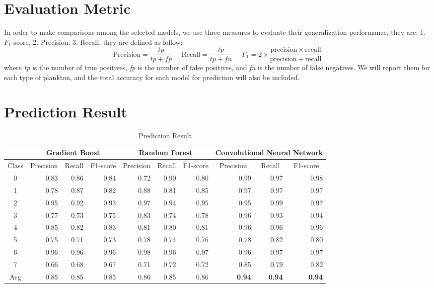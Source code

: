 \documentclass[11pt,oneside,a4paper]{article}
\numberwithin{equation}{section}
\begin{document}
\section{Evaluation Metric}
In order to make comparisons among the selected models, we use three measures to evaluate their generalization performance, they are: 1. $F_1$-score, 2. Precision, 3. Recall. they are defined as follow:
$$\mathrm{Precision} = \frac{tp}{tp + fp}~~~~~~
\mathrm{Recall} = \frac{{tp}}{{tp + fn}}~~~~~~
F_{1} = 2 \times \frac{\mathrm{precision} \times \mathrm{recall}}{\mathrm{precision} + \mathrm{recall}}$$
where \textit{tp} is the number of true positives, \textit{fp} is the number of false positives, and \textit{fn} is the number of false negatives. We will report them for each type of plankton, and the total accuracy for each model for prediction will also be included.

\section{Prediction Result}
\begin{table}[ht]
\centering
\small
\caption{Prediction Result}
\begin{tabular}{crrrrrrrrr}
\toprule
& \multicolumn{3}{c}{Gradient Boost} & \multicolumn{3}{c}{Random Forest} & \multicolumn{3}{c}{Convolutional Neural Network}\\
\midrule
\multicolumn{1}{c}{Class} & \multicolumn{1}{c}{Precision} & \multicolumn{1}{c}{Recall} & \multicolumn{1}{c}{F1-score} & \multicolumn{1}{c}{Precision} & \multicolumn{1}{c}{Recall} & \multicolumn{1}{c}{F1-score}& \multicolumn{1}{c}{Precision} & \multicolumn{1}{c}{Recall} & \multicolumn{1}{c}{F1-score} \\
0           & 0.83      & 0.86   & 0.84     & 0.72      & 0.90   & 0.80     & 0.99      & 0.97   & 0.98     \\
1           & 0.78      & 0.87   & 0.82     & 0.88      & 0.81   & 0.85     & 0.97      & 0.97   & 0.97     \\
2           & 0.95      & 0.92   & 0.93     & 0.97      & 0.94   & 0.95     & 0.95      & 0.99   & 0.97     \\
3           & 0.77      & 0.73   & 0.75     & 0.83      & 0.74   & 0.78     & 0.96      & 0.93   & 0.94     \\
4           & 0.85      & 0.82   & 0.83     & 0.81      & 0.80   & 0.81     & 0.96      & 0.96   & 0.96     \\
5           & 0.75      & 0.71   & 0.73     & 0.78      & 0.74   & 0.76     & 0.78      & 0.82   & 0.80     \\
6           & 0.96      & 0.96   & 0.96     & 0.98      & 0.96   & 0.97     & 0.96      & 0.97   & 0.97     \\
7           & 0.66      & 0.68   & 0.67     & 0.71      & 0.72   & 0.72     & 0.85      & 0.79   & 0.82     \\
\midrule
Avg         & 0.85      & 0.85   & 0.85     & 0.86      & 0.85   & 0.86     & \textbf{0.94}      & \textbf{0.94}   & \textbf{0.94}     \\
\bottomrule
\end{tabular}
\label{tab:result}
\end{table}
\end{document}
